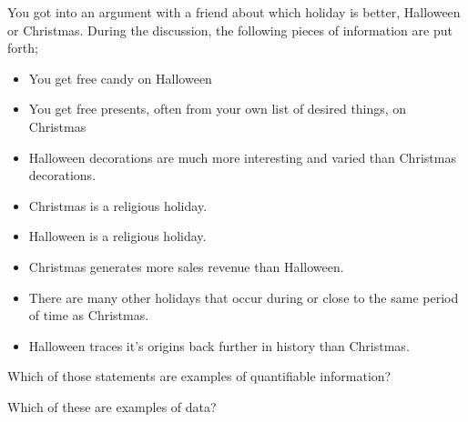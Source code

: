 \documentclass{ximera}
\begin{document}
\begin{problem}
    You got into an argument with a friend about which holiday is better, Halloween or Christmas. During the discussion, the following pieces of information are put forth;
    \begin{itemize}
        \item You get free candy on Halloween
        \item You get free presents, often from your own list of desired things, on Christmas
        \item Halloween decorations are much more interesting and varied than Christmas decorations.
        \item Christmas is a religious holiday.
        \item Halloween is a religious holiday.
        \item Christmas generates more sales revenue than Halloween.
        \item There are many other holidays that occur during or close to the same period of time as Christmas.
        \item Halloween traces it's origins back further in history than Christmas.
    \end{itemize}
    Which of those statements are examples of quantifiable information?
    \begin{selectAll}
    \end{selectAll}
    \begin{problem}
        Which of these are examples of data?
        \begin{selectAll}

\end{selectAll}
\end{problem}
\end{problem}
\end{document}
